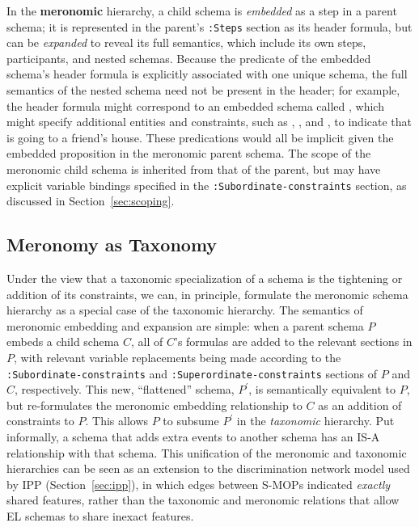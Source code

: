 In the \textbf{meronomic} hierarchy, a child schema is \textit{embedded} as a step in a parent schema; it is represented in the parent's \texttt{:Steps} section as its header formula, but can be \textit{expanded} to reveal its full semantics, which include its own steps, participants, and nested schemas.
Because the predicate of the embedded schema's header formula is explicitly associated with one unique schema, the full semantics of the nested schema need not be present in the header; for example, the header formula  might correspond to an embedded schema called , which might specify additional entities and constraints, such as , , and , to indicate that  is going to a friend's house. These predications would all be implicit given the embedded  proposition in the meronomic parent schema.
The scope of the meronomic child schema is inherited from that of the parent, but may have explicit variable bindings specified in the \texttt{:Subordinate-constraints} section, as discussed in Section~\ref{sec:scoping}.

\subsection{Meronomy as Taxonomy}
Under the view that a taxonomic specialization of a schema is the tightening or addition of its constraints, we can, in principle, formulate the meronomic schema hierarchy as a special case of the taxonomic hierarchy. The semantics of meronomic embedding and expansion are simple: when a parent schema $P$ embeds a child schema $C$, all of $C$'s formulas are added to the relevant sections in $P$, with relevant variable replacements being made according to the \texttt{:Subordinate-constraints} and \texttt{:Superordinate-constraints} sections of $P$ and $C$, respectively. This new, ``flattened'' schema, $P^{\prime}$, is semantically equivalent to $P$, but re-formulates the meronomic embedding relationship to $C$ as an addition of constraints to $P$. This allows $P$ to subsume $P^{\prime}$ in the \textit{taxonomic} hierarchy. Put informally, a schema that adds extra events to another schema has an IS-A relationship with that schema. This unification of the meronomic and taxonomic hierarchies can be seen as an extension to the discrimination network model used by IPP (Section~\ref{sec:ipp}), in which edges between S-MOPs indicated \textit{exactly} shared features, rather than the taxonomic and meronomic relations that allow EL schemas to share inexact features.
